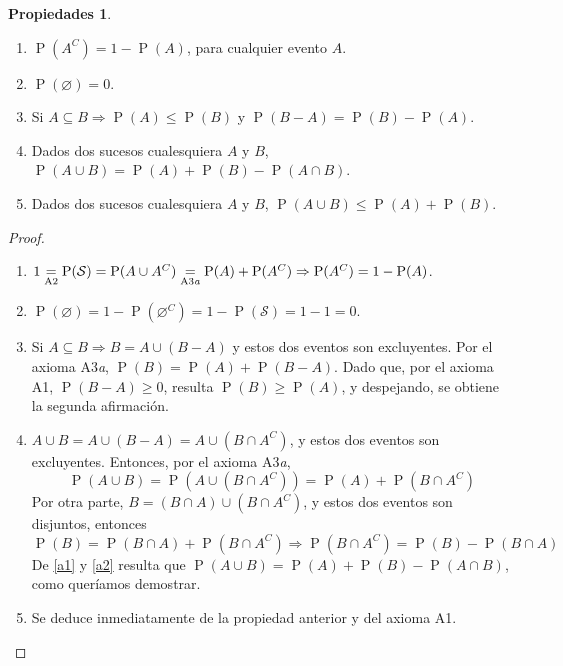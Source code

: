 \documentclass[11pt]{article}
\theoremstyle{plain}
\theoremstyle{definition}
\newtheorem*{props}{Propiedades}
\theoremstyle{remark}
\newcommand{\proba}{\ensuremath{\operatorname{P}}}  %
\newcommand{\espm}[0]{\ensuremath{\mathcal{S}}}  %
\begin{document}
  \begin{props} \
    \begin{enumerate}
      \item $\proba(A^C) = 1 - \proba(A)$, para cualquier evento $A$.

      \item $\proba(\varnothing) = 0$.

      \item Si $A \subseteq B \Rightarrow \proba(A) \leq \proba(B)$ y $\proba(B - A) = \proba(B) - \proba(A)$.

      \item Dados dos sucesos cualesquiera $A$ y $B$, $\proba(A \cup B) = \proba(A) + \proba(B) - \proba(A \cap B)$.

      \item Dados dos sucesos cualesquiera $A$ y $B$, $\proba(A \cup B) \leq \proba(A) + \proba(B)$.
    \end{enumerate}
  \end{props}

  \begin{proof} \
    \begin{enumerate}
      \item $1 \underset{\text{A2}}{=} \proba(\espm) = \proba(A \cup A^C) \underset{\text{A3\textit{a}}}{=} \proba(A) + \proba(A^C) \Rightarrow \proba(A^C) = 1 - \proba(A)$.

      \item $\proba(\varnothing) = 1 - \proba(\varnothing^C) = 1 - \proba(\espm) = 1 - 1 = 0$.

      \item Si $A \subseteq B \Rightarrow B = A \cup (B - A)$ y estos dos eventos son excluyentes. Por el axioma A3\textit{a}, $\proba(B) = \proba(A) + \proba(B - A)$. Dado que, por el axioma A1, $\proba(B - A) \geq 0$, resulta $\proba(B) \geq \proba(A)$, y despejando, se obtiene la segunda afirmación.

      \item $A \cup B = A \cup (B - A) = A \cup (B \cap A^C)$, y estos dos eventos son excluyentes. Entonces, por el axioma A3\textit{a},
        \begin{equation} \label{a1} \proba(A \cup B) = \proba(A \cup (B \cap A^C)) = \proba(A) + \proba(B \cap A^C) \end{equation}
        Por otra parte, $B = (B \cap A) \cup (B \cap A^C)$, y estos dos eventos son disjuntos, entonces
        \begin{equation} \label{a2} \proba(B) = \proba(B \cap A) + \proba(B \cap A^C) \Rightarrow \proba(B \cap A^C) = \proba(B) - \proba(B \cap A) \end{equation}
        De \eqref{a1} y \eqref{a2} resulta que $\proba(A \cup B) = \proba(A) + \proba (B) - \proba(A \cap B)$, como queríamos demostrar.

      \item Se deduce inmediatamente de la propiedad anterior y del axioma A1. \qedhere
    \end{enumerate}
  \end{proof}
\end{document}
